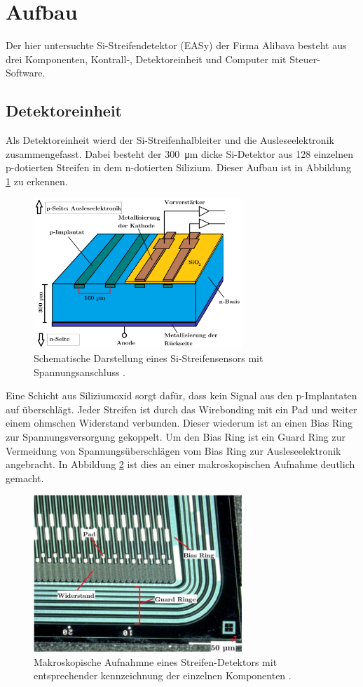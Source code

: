 \newpage
\section{Aufbau}
\label{sec:Aufbau}
Der hier untersuchte Si-Streifendetektor (EASy) der Firma Alibava besteht aus drei Komponenten, Kontrall-, Detektoreinheit und Computer mit Steuer-Software.

\subsection{Detektoreinheit}
\label{sec:Detektoreinheit}
 Als Detektoreinheit wierd der Si-Streifenhalbleiter und die Ausleseelektronik
 zusammengefasst. Dabei besteht der \SI{300}{\micro\meter} dicke Si-Detektor
 aus 128 einzelnen p-dotierten Streifen in dem n-dotierten Silizium.  Dieser
 Aufbau ist in Abbildung \ref{fig:schema} zu erkennen.
 \begin{figure}[htb]
   \centering
   \includegraphics[width=0.7\textwidth]{images/Schema.png}
   \caption{Schematische Darstellung eines Si-Streifensensors mit Spannungsanschluss \cite{anleitung}.}
   \label{fig:schema}
 \end{figure}
Eine Schicht aus Siliziumoxid sorgt dafür, dass kein Signal aus den p-Implantaten
auf überschlägt. Jeder Streifen ist durch das Wirebonding mit ein Pad und weiter
einem ohmschen Widerstand
verbunden. Dieser wiederum ist an einen Bias Ring zur Spannungsversorgung gekoppelt.
Um den Bias Ring ist ein Guard Ring zur Vermeidung von Spannungsüberschlägen vom Bias
Ring zur Ausleseelektronik angebracht. In Abbildung \ref{fig:streifen} ist dies an
einer makroskopischen Aufnahme deutlich gemacht.
\begin{figure}[htb]
  \centering
  \includegraphics[width=0.7\textwidth]{images/Sensor.png}
  \caption{Makroskopische Aufnahmne eines Streifen-Detektors mit entsprechender kennzeichnung der einzelnen Komponenten \cite{anleitung}.}
  \label{fig:streifen}
\end{figure}
